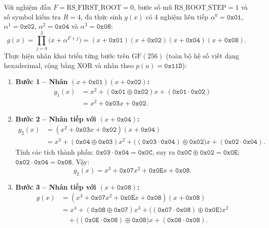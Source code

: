 \documentclass[12pt,a4paper]{report}
\begin{document}
Với nghiệm đầu $F = \text{RS\_FIRST\_ROOT} = 0$, bước số mũ $\text{RS\_ROOT\_STEP} = 1$ và số symbol kiểm tra $R = 4$, đa thức sinh $g(x)$ có $4$ nghiệm liên tiếp $\alpha^0 = \texttt{0x01}$, $\alpha^1 = \texttt{0x02}$, $\alpha^2 = \texttt{0x04}$ và $\alpha^3 = \texttt{0x08}$:
\begin{equation}
    g(x) = \prod_{j=0}^{3} \bigl(x + \alpha^{F+j}\bigr) = (x + \texttt{0x01})(x + \texttt{0x02})(x + \texttt{0x04})(x + \texttt{0x08}).
    \label{eq:gen-poly-prod}
\end{equation}
Thực hiện nhân khai triển từng bước trên $\text{GF}(256)$ (toàn bộ hệ số viết dạng hexadecimal, cộng bằng XOR và nhân theo $p(u) = \texttt{0x11D}$):
\begin{enumerate}
    \item \textbf{Bước 1 -- Nhân $(x + \texttt{0x01})(x + \texttt{0x02})$:}
    \begin{align*}
        g_1(x) &= x^2 + (\texttt{0x01} \oplus \texttt{0x02})x + (\texttt{0x01} \cdot \texttt{0x02}) \\
               &= x^2 + \texttt{0x03}x + \texttt{0x02}.
    \end{align*}
    \item \textbf{Bước 2 -- Nhân tiếp với $(x + \texttt{0x04})$:}
    \begin{align*}
        g_2(x) &= (x^2 + \texttt{0x03}x + \texttt{0x02})(x + \texttt{0x04}) \\
               &= x^3 + (\texttt{0x04} \oplus \texttt{0x03})x^2 + \bigl((\texttt{0x03} \cdot \texttt{0x04}) \oplus \texttt{0x02}\bigr)x + (\texttt{0x02} \cdot \texttt{0x04}).
    \end{align*}
    Tính các tích thành phần: $\texttt{0x03} \cdot \texttt{0x04} = \texttt{0x0C}$, suy ra $\texttt{0x0C} \oplus \texttt{0x02} = \texttt{0x0E}$; $\texttt{0x02} \cdot \texttt{0x04} = \texttt{0x08}$. Vậy:
    \[
        g_2(x) = x^3 + \texttt{0x07}x^2 + \texttt{0x0E}x + \texttt{0x08}.
    \]
    \item \textbf{Bước 3 -- Nhân tiếp với $(x + \texttt{0x08})$:}
    \begin{align*}
        g(x) &= (x^3 + \texttt{0x07}x^2 + \texttt{0x0E}x + \texttt{0x08})(x + \texttt{0x08}) \\
             &= x^4 + (\texttt{0x08} \oplus \texttt{0x07})x^3 + \bigl((\texttt{0x07} \cdot \texttt{0x08}) \oplus \texttt{0x0E}\bigr)x^2 \\
             &\quad + \bigl((\texttt{0x0E} \cdot \texttt{0x08}) \oplus \texttt{0x08}\bigr)x + (\texttt{0x08} \cdot \texttt{0x08}).

\end{align*}
\end{enumerate}
\end{document}

